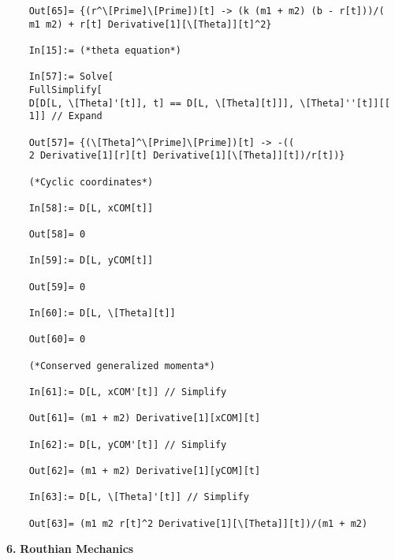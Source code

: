 \documentclass{article}
\theoremstyle{definition}
\begin{document}
\begin{enumerate}[label = (\alph*)]
\begin{lstlisting}
	Out[65]= {(r^\[Prime]\[Prime])[t] -> (k (m1 + m2) (b - r[t]))/(
	m1 m2) + r[t] Derivative[1][\[Theta]][t]^2}
	
	In[15]:= (*theta equation*)
	
	In[57]:= Solve[
	FullSimplify[
	D[D[L, \[Theta]'[t]], t] == D[L, \[Theta][t]]], \[Theta]''[t]][[
	1]] // Expand
	
	Out[57]= {(\[Theta]^\[Prime]\[Prime])[t] -> -((
	2 Derivative[1][r][t] Derivative[1][\[Theta]][t])/r[t])}
	
	(*Cyclic coordinates*)
	
	In[58]:= D[L, xCOM[t]]
	
	Out[58]= 0
	
	In[59]:= D[L, yCOM[t]]
	
	Out[59]= 0
	
	In[60]:= D[L, \[Theta][t]]
	
	Out[60]= 0
	
	(*Conserved generalized momenta*)
	
	In[61]:= D[L, xCOM'[t]] // Simplify
	
	Out[61]= (m1 + m2) Derivative[1][xCOM][t]
	
	In[62]:= D[L, yCOM'[t]] // Simplify
	
	Out[62]= (m1 + m2) Derivative[1][yCOM][t]
	
	In[63]:= D[L, \[Theta]'[t]] // Simplify
	
	Out[63]= (m1 m2 r[t]^2 Derivative[1][\[Theta]][t])/(m1 + m2)
	\end{lstlisting}
\end{enumerate}











\newpage
\noindent \textbf{6.} \textbf{Routhian Mechanics}\\
\end{document}
